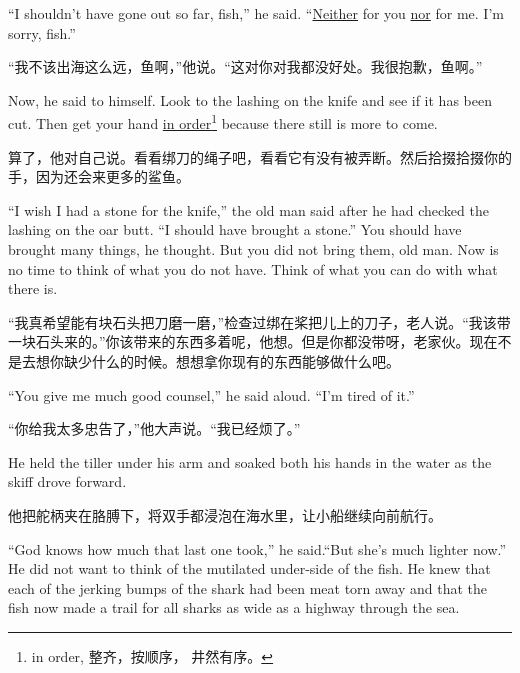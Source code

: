 \begin{paracol}{2}
\switchcolumn*

``I shouldn't have gone out so far, fish,'' he said. ``\uline{Neither} for
you \uline{nor} for me. I'm sorry, fish.''

\switchcolumn

“我不该出海这么远，鱼啊，”他说。“这对你对我都没好处。我很抱歉，鱼啊。”

\switchcolumn*

Now, he said to himself. Look to the lashing on the knife and see if it has
been cut. Then get your hand \uline{in order}\footnote{in order, 整齐，按顺序，
  井然有序。} because there still is more to come.

\switchcolumn

算了，他对自己说。看看绑刀的绳子吧，看看它有没有被弄断。然后拾掇拾掇你的手，因为还会来更多的鲨鱼。

\switchcolumn*

``I wish I had a stone for the knife,'' the old man said after he had
checked the lashing on the oar butt. ``I should have brought a stone.'' You
should have brought many things, he thought. But you did not bring them, old
man. Now is no time to think of what you do not have. Think of what you can
do with what there is.

\switchcolumn

“我真希望能有块石头把刀磨一磨，”检查过绑在桨把儿上的刀子，老人说。“我该带一块石头来的。”你该带来的东西多着呢，他想。但是你都没带呀，老家伙。现在不是去想你缺少什么的时候。想想拿你现有的东西能够做什么吧。

\switchcolumn*

``You give me much good \gls{counsel},'' he said aloud. ``I'm tired of it.''

\switchcolumn

“你给我太多忠告了，”他大声说。“我已经烦了。”

\switchcolumn*

He held the tiller under his arm and soaked both his hands in the water as
the skiff drove forward.

\switchcolumn

他把舵柄夹在胳膊下，将双手都浸泡在海水里，让小船继续向前航行。

\switchcolumn*

``God knows how much that last one took,'' he said.``But she's much lighter
now.'' He did not want to think of the mutilated under-side of the fish. He
knew that each of the jerking \glspl{bump} of the shark had been meat
\gls{torn} away and that the fish now made a trail for all sharks as wide as
a \gls{highway} through the sea.


\end{paracol}
